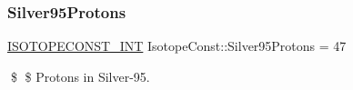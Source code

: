 \subsubsection{\texorpdfstring{Silver95\+Protons}{Silver95Protons}}
{\footnotesize\ttfamily \mbox{\hyperlink{group___isotope_const-_macros_ga5f18360b3e99483a35c32d789e62621c}{I\+S\+O\+T\+O\+P\+E\+C\+O\+N\+S\+T\+\_\+\+I\+NT}} Isotope\+Const\+::\+Silver95\+Protons = 47}

\$ \$ Protons in Silver-\/95. 